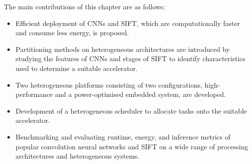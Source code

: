 The main contributions of this chapter are as follows:
\begin{itemize}
\item Efficient deployment of CNNs and SIFT, which are computationally faster and consume less energy, is proposed.
\item Partitioning methods on heterogeneous architectures are introduced by studying the features of CNNs and stages of SIFT to identify characteristics used to determine a suitable accelerator.
\item Two heterogeneous platforms consisting of two configurations, high-performance and a power-optimised embedded system, are developed.
\item Development of a heterogeneous scheduler to allocate tasks onto the suitable accelerator.
\item Benchmarking and evaluating runtime, energy, and inference metrics of popular convolution neural networks and SIFT on a wide range of processing architectures and heterogeneous systems.
\end{itemize}







